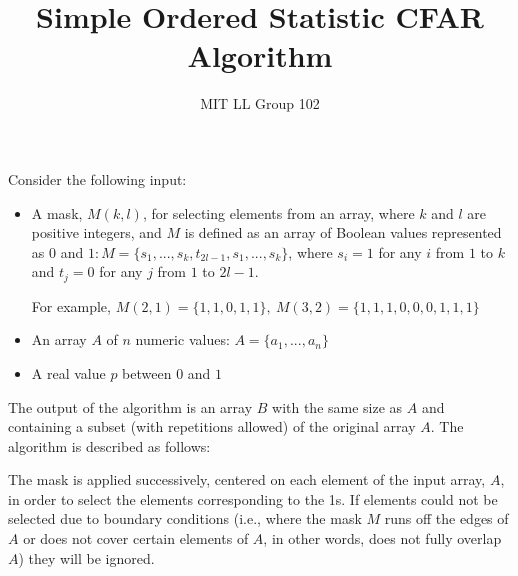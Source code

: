 \documentclass{article}
\title{Simple Ordered Statistic CFAR Algorithm}
\author{MIT LL Group 102}
\begin{document}
\maketitle

\begin{flushleft}
Consider the following input:

\begin{itemize}
  \item A mask, $M(k,l)$, for selecting elements from an array, where $k$ and $l$ are positive integers, and $M$ is defined as an array of Boolean values represented as $0$ and $1:M=\{s_{1}, ..., s_{k}, t_{2l-1}, s_{1}, ..., s_{k}\}$, where $s_{i}=1$ for any $i$ from $1$ to $k$ and $t_{j}=0$ for any $j$ from $1$ to $2l-1$. \par For example, $M(2,1)=\{1,1,0,1,1\},\ M(3,2)=\{1,1,1,0,0,0,1,1,1\}$
  \item An array $A$ of $n$ numeric values: $A=\{a_{1}, ..., a_{n}\}$
  \item A real value $p$ between $0$ and $1$  
\end{itemize}

The output of the algorithm is an array $B$ with the same size as $A$ and containing a subset (with repetitions allowed) of the original array $A$. The algorithm is described as follows: \par \end{flushleft}

\hangindent=1cm The mask is applied successively, centered on each element of the input array, $A$, in order to select the elements corresponding to the 1s. If elements could not be selected due to boundary conditions (i.e., where the mask $M$ runs off the edges of $A$ or does not cover certain elements of $A$, in other words, does not fully overlap $A$) they will be ignored. \par
\end{document}
